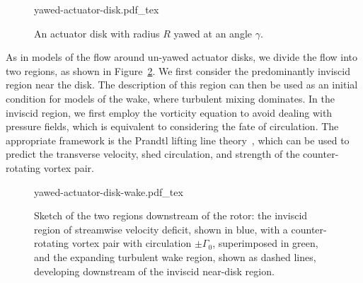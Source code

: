 \begin{figure}
\begin{center}
{yawed-actuator-disk.pdf_tex}
\end{center}
\caption{\label{fig:yawed-actuator-disk} An actuator disk with radius $R$ yawed at an angle $\gamma$.}
\end{figure}

As in models of the flow around un-yawed actuator disks, we divide the flow into two regions, as shown in Figure~\ref{fig:yawed-actuator-disk-wake}. We first consider the predominantly inviscid region near the disk. The description of this region can then be used as an initial condition for models of the wake, where turbulent mixing dominates.  In the inviscid region, we first employ the vorticity equation to avoid dealing with pressure fields, which is equivalent to considering the fate of circulation. The appropriate framework is the Prandtl lifting line theory~\cite{Milne-Thomson1973a}, which can be used to predict the transverse velocity, shed circulation, and strength of the counter-rotating vortex pair. 

\begin{figure}
\begin{center}
{yawed-actuator-disk-wake.pdf_tex}
\end{center}
\caption{\label{fig:yawed-actuator-disk-wake} Sketch of the two regions downstream of the rotor: the inviscid region of streamwise velocity deficit, shown in blue, with a counter-rotating vortex pair with circulation $\pm\Gamma_0$, superimposed in green, and the expanding turbulent wake region, shown as dashed lines, developing downstream of the inviscid near-disk region.}
\end{figure}

